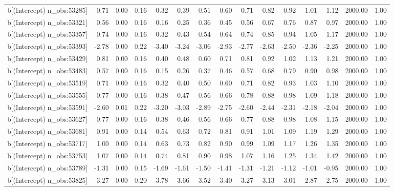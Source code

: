 \begin{table}[ht]
\begin{tabular}{rrrrrrrrrrrrrrr}
  b[(Intercept) n\_obs:53285] & 0.71 & 0.00 & 0.16 & 0.32 & 0.39 & 0.51 & 0.60 & 0.71 & 0.82 & 0.92 & 1.01 & 1.12 & 2000.00 & 1.00 \\ 
  b[(Intercept) n\_obs:53321] & 0.56 & 0.00 & 0.16 & 0.16 & 0.25 & 0.36 & 0.45 & 0.56 & 0.67 & 0.76 & 0.87 & 0.97 & 2000.00 & 1.00 \\ 
  b[(Intercept) n\_obs:53357] & 0.74 & 0.00 & 0.16 & 0.32 & 0.43 & 0.54 & 0.64 & 0.74 & 0.85 & 0.94 & 1.05 & 1.17 & 2000.00 & 1.00 \\ 
  b[(Intercept) n\_obs:53393] & -2.78 & 0.00 & 0.22 & -3.40 & -3.24 & -3.06 & -2.93 & -2.77 & -2.63 & -2.50 & -2.36 & -2.25 & 2000.00 & 1.00 \\ 
  b[(Intercept) n\_obs:53429] & 0.81 & 0.00 & 0.16 & 0.40 & 0.48 & 0.60 & 0.71 & 0.81 & 0.92 & 1.02 & 1.13 & 1.21 & 2000.00 & 1.00 \\ 
  b[(Intercept) n\_obs:53483] & 0.57 & 0.00 & 0.16 & 0.15 & 0.26 & 0.37 & 0.46 & 0.57 & 0.68 & 0.79 & 0.90 & 0.98 & 2000.00 & 1.00 \\ 
  b[(Intercept) n\_obs:53519] & 0.71 & 0.00 & 0.16 & 0.32 & 0.40 & 0.50 & 0.60 & 0.71 & 0.82 & 0.93 & 1.03 & 1.10 & 2000.00 & 1.00 \\ 
  b[(Intercept) n\_obs:53555] & 0.77 & 0.00 & 0.16 & 0.38 & 0.47 & 0.56 & 0.66 & 0.78 & 0.88 & 0.98 & 1.09 & 1.18 & 2000.00 & 1.00 \\ 
  b[(Intercept) n\_obs:53591] & -2.60 & 0.01 & 0.22 & -3.20 & -3.03 & -2.89 & -2.75 & -2.60 & -2.44 & -2.31 & -2.18 & -2.04 & 2000.00 & 1.00 \\ 
  b[(Intercept) n\_obs:53627] & 0.77 & 0.00 & 0.16 & 0.38 & 0.46 & 0.56 & 0.66 & 0.77 & 0.88 & 0.98 & 1.08 & 1.15 & 2000.00 & 1.00 \\ 
  b[(Intercept) n\_obs:53681] & 0.91 & 0.00 & 0.14 & 0.54 & 0.63 & 0.72 & 0.81 & 0.91 & 1.01 & 1.09 & 1.19 & 1.29 & 2000.00 & 1.00 \\ 
  b[(Intercept) n\_obs:53717] & 1.00 & 0.00 & 0.14 & 0.63 & 0.73 & 0.82 & 0.90 & 0.99 & 1.09 & 1.17 & 1.26 & 1.35 & 2000.00 & 1.00 \\ 
  b[(Intercept) n\_obs:53753] & 1.07 & 0.00 & 0.14 & 0.74 & 0.81 & 0.90 & 0.98 & 1.07 & 1.16 & 1.25 & 1.34 & 1.42 & 2000.00 & 1.00 \\ 
  b[(Intercept) n\_obs:53789] & -1.31 & 0.00 & 0.15 & -1.69 & -1.61 & -1.50 & -1.41 & -1.31 & -1.21 & -1.12 & -1.01 & -0.95 & 2000.00 & 1.00 \\ 
  b[(Intercept) n\_obs:53825] & -3.27 & 0.00 & 0.20 & -3.78 & -3.66 & -3.52 & -3.40 & -3.27 & -3.13 & -3.01 & -2.87 & -2.75 & 2000.00 & 1.00 \\ 

\end{tabular}
\end{table}
